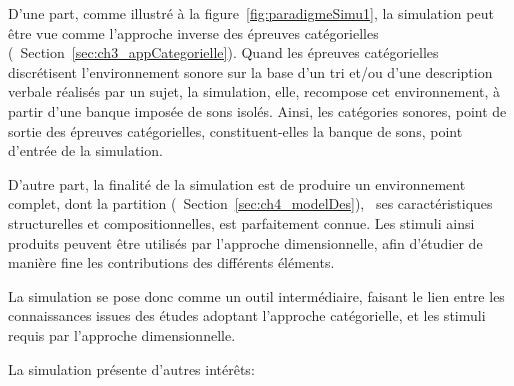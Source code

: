 D'une part, comme illustré à la figure~\ref{fig:paradigmeSimu1}, la simulation peut être vue comme l'approche inverse des épreuves catégorielles (\cf~Section~\ref{sec:ch3_appCategorielle}). Quand les épreuves catégorielles discrétisent l'environnement sonore sur la base d'un tri et/ou d'une description verbale réalisés  par un sujet, la simulation, elle, recompose cet environnement, à partir d'une banque imposée de sons isolés. Ainsi, les catégories sonores, point de sortie des épreuves catégorielles, constituent-elles la banque de sons, point d'entrée de la simulation.

D'autre part, la finalité de la simulation est de produire un environnement complet, dont la partition (\cf~Section~\ref{sec:ch4_modelDes}), \ie~ses caractéristiques structurelles et compositionnelles, est parfaitement connue. Les stimuli ainsi produits peuvent être utilisés par l'approche dimensionnelle, afin d'étudier de manière fine les contributions des différents éléments.

La simulation se pose donc comme un outil intermédiaire, faisant le lien entre les connaissances issues des études adoptant l'approche catégorielle, et les stimuli requis par l'approche dimensionnelle.

La simulation présente d'autres intérêts:

